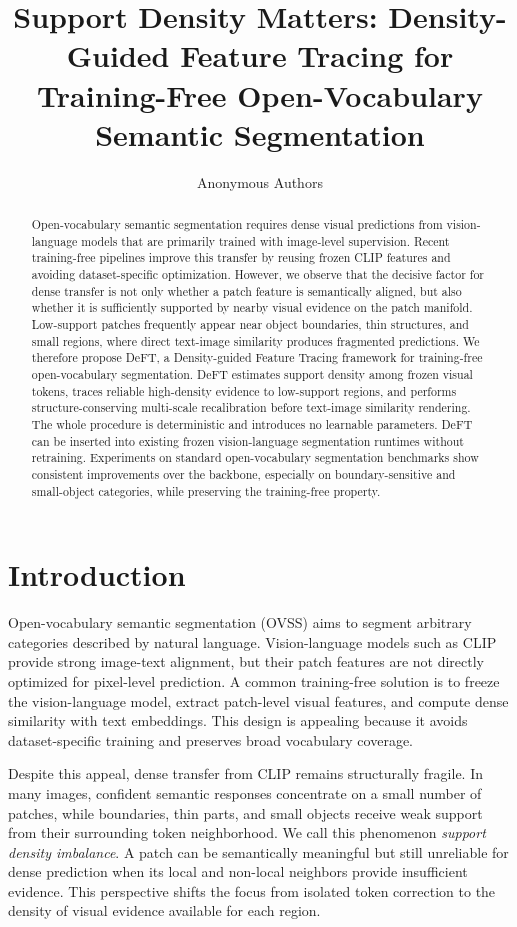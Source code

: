 \documentclass[letterpaper]{article}
\title{Support Density Matters: Density-Guided Feature Tracing for Training-Free Open-Vocabulary Semantic Segmentation}
\author{
Anonymous Authors
}
\begin{document}
\maketitle

\begin{abstract}
Open-vocabulary semantic segmentation requires dense visual predictions from
vision-language models that are primarily trained with image-level supervision.
Recent training-free pipelines improve this transfer by reusing frozen CLIP
features and avoiding dataset-specific optimization. However, we observe that
the decisive factor for dense transfer is not only whether a patch feature is
semantically aligned, but also whether it is sufficiently supported by nearby
visual evidence on the patch manifold. Low-support patches frequently appear
near object boundaries, thin structures, and small regions, where direct
text-image similarity produces fragmented predictions. We therefore propose
DeFT, a Density-guided Feature Tracing framework for training-free
open-vocabulary segmentation. DeFT estimates support density among frozen visual
tokens, traces reliable high-density evidence to low-support regions, and
performs structure-conserving multi-scale recalibration before text-image
similarity rendering. The whole procedure is deterministic and introduces no
learnable parameters. DeFT can be inserted into existing frozen
vision-language segmentation runtimes without retraining. Experiments on standard open-vocabulary
segmentation benchmarks show consistent improvements over the backbone,
especially on boundary-sensitive and small-object categories, while preserving
the training-free property.
\end{abstract}

\section{Introduction}

Open-vocabulary semantic segmentation (OVSS) aims to segment arbitrary
categories described by natural language. Vision-language models such as CLIP
provide strong image-text alignment, but their patch features are not directly
optimized for pixel-level prediction. A common training-free solution is to
freeze the vision-language model, extract patch-level visual features, and
compute dense similarity with text embeddings. This design is appealing because
it avoids dataset-specific training and preserves broad vocabulary coverage.

Despite this appeal, dense transfer from CLIP remains structurally fragile. In
many images, confident semantic responses concentrate on a small number of
patches, while boundaries, thin parts, and small objects receive weak support
from their surrounding token neighborhood. We call this phenomenon \emph{support
density imbalance}. A patch can be semantically meaningful but still unreliable
for dense prediction when its local and non-local neighbors provide insufficient
evidence. This perspective shifts the focus from isolated token correction to
the density of visual evidence available for each region.
\end{document}
